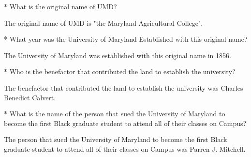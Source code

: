 

%
%

\newcommand{\hmwkTitle}{Week 11 Discussion}
\newcommand{\hmwkDueDate}{November 11, 2024}
\newcommand{\hmwkDueTime}{11:59 PM}
\newcommand{\hmwkClass}{HISP 200}
\newcommand{\hmwkClassTime}{Section 0101}
\newcommand{\hmwkClassInstructor}{Prof. Woehlke}
\newcommand{\hmwkAuthorName}{\textbf{Vai Srivastava}}
\newcommand{\hmwkCompletionDate}{\today}



\maketitle

\pagebreak

\begin{hwkProblem}{1}{}*
	What is the original name of UMD?

	\hwkSol

	The original name of UMD is "the Maryland Agricultural College".
\end{hwkProblem}

\begin{hwkProblem}{2}{}*
	What year was the University of Maryland Established with this original name? 

	\hwkSol

	The University of Maryland was established with this original name in 1856.
\end{hwkProblem}

\begin{hwkProblem}{3}{}*
	Who is the benefactor that contributed the land to establish the university?

	\hwkSol

	The benefactor that contributed the land to establish the university was Charles Benedict Calvert.
\end{hwkProblem}

\begin{hwkProblem}{4}{}*
	What is the name of the person that sued the University of Maryland to become the first Black graduate student to attend all of their classes on Campus?

	\hwkSol

	The person that sued the University of Maryland to become the first Black graduate student to attend all of their classes on Campus was Parren J. Mitchell.
\end{hwkProblem}


